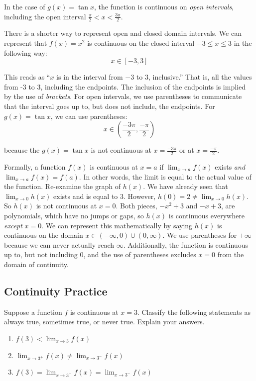 In the case of $g(x) = \tan{x}$, the function is continuous on \textit{open 
intervals}, including the open interval $\frac{\pi}{2} < x < \frac{3\pi}{2}$.

There is a shorter way to represent open and closed domain intervals. We can 
represent that $f(x) = x^2$ is continuous on the closed interval $-3 \leq x \leq 3$ 
in the following way: $$x \in \left[-3, 3 \right]$$

This reads as ``$x$ is in the interval from $-3$ to 3, inclusive.'' That is, all the 
values from -3 to 3, including the endpoints. The inclusion of the endpoints is 
implied by the use of \textit{brackets}. For open intervals, we use parentheses to 
communicate that the interval goes up to, but does not include, the endpoints. For 
$g(x) = \tan{x}$, we can use parentheses: 
$$x \in \left(\frac{-3\pi}{2}, \frac{-\pi}{2}\right)$$

because the $g(x) = \tan{x}$ is not continuous at $x=\frac{-3\pi}{2}$ or at 
$x=\frac{-\pi}{2}$.



Formally, a function $f(x)$ is continuous at $x=a$ if $\lim_{x\to a}f(x)$ exists 
\textit{and} $\lim_{x\to a}f(x) = f(a)$. In other words, the limit is equal to the actual 
value of the function. Re-examine the graph of $h(x)$. We have already seen that $
\lim_{x\to 0}h(x)$ exists and is equal to 3. However, $h(0) = 2 \neq \lim_{x\to0}
h(x)$. So $h(x)$ is not continuous at $x = 0$. Both pieces, $-x^2+3$ and $-x+3$,
are polynomials, which have no jumps or gaps, so $h(x)$ is continuous
everywhere \textit{except} $x=0$. We can represent this 
mathematically by saying $h(x)$ is continuous on the domain $x \in \left(-\infty, 
0\right)\cup \left(0, \infty\right)$. We use parentheses for $\pm\infty$ because we 
can never actually reach $\infty$. Additionally, the function is continuous up to, 
but not including $0$, and the use of parentheses excludes $x=0$ from the domain of 
continuity.

\subsection{Continuity Practice}
\begin{Exercise} Suppose a function $f$ is 
continuous at $x = 3$. Classify the following statements as always true, 
sometimes true, or never true. Explain your answers. 
\begin{enumerate}
\item $f(3) < \lim_{x \to 3} f(x)$
\item $\lim_{x \to 3^+} f(x) \neq \lim_{x \to 3^-} f(x)$
\item $f(3) = \lim_{x \to 3^+} f(x) = \lim_{x \to 3^-} f(x)$
\end{enumerate}
\end{Exercise}

